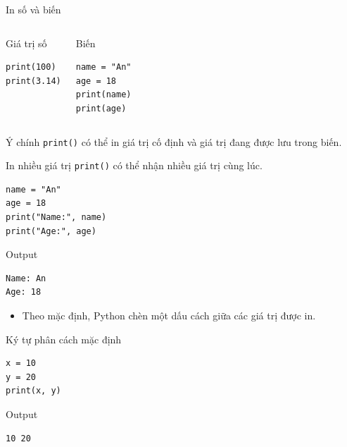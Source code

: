 \documentclass[aspectratio=169,10pt]{beamer}
\begin{document}
\begin{frame}[fragile]{In số và biến}
\begin{columns}[T,onlytextwidth]
\begin{block}{Giá trị số}
\begin{lstlisting}
print(100)
print(3.14)
\end{lstlisting}
\end{block}
\begin{block}{Biến}
\begin{lstlisting}
name = "An"
age = 18
print(name)
print(age)
\end{lstlisting}
\end{block}
\end{columns}
\vspace{0.3cm}
\begin{alertblock}{Ý chính}
\texttt{print()} có thể in giá trị cố định và giá trị đang được lưu trong biến.
\end{alertblock}
\end{frame}

\begin{frame}[fragile]{In nhiều giá trị}
\texttt{print()} có thể nhận nhiều giá trị cùng lúc.
\begin{lstlisting}
name = "An"
age = 18
print("Name:", name)
print("Age:", age)
\end{lstlisting}
\begin{block}{Output}
\begin{verbatim}
Name: An
Age: 18
\end{verbatim}
\end{block}
\begin{itemize}
  \item Theo mặc định, Python chèn một dấu cách giữa các giá trị được in.
\end{itemize}
\end{frame}

\begin{frame}[fragile]{Ký tự phân cách mặc định}
\begin{lstlisting}
x = 10
y = 20
print(x, y)
\end{lstlisting}
\begin{block}{Output}
\begin{verbatim}
10 20
\end{verbatim}
\end{block}
\begin{center}
\end{center}
\end{frame}
\end{document}
